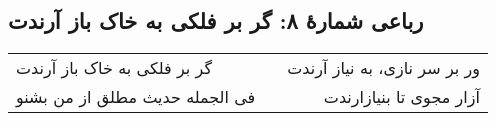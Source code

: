 \begin{center}
\section*{رباعی شمارهٔ ۸: گر بر فلکی به خاک باز آرندت}
\label{sec:008}
\begin{longtable}{l p{0.5cm} r}
گر بر فلکی به خاک باز آرندت
&&
ور بر سر نازی، به نیاز آرندت
\\
فی الجمله حدیث مطلق از من بشنو
&&
آزار مجوی تا بنیازارندت
\\
\end{longtable}
\end{center}

